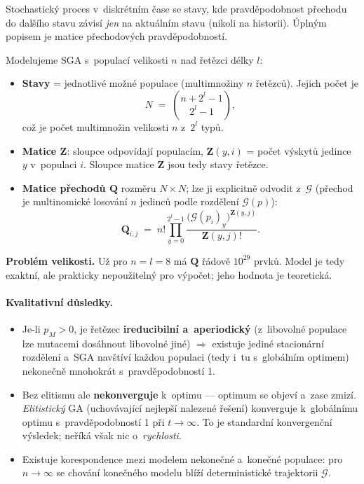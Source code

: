 \documentclass[11pt,a4paper]{article}
\theoremstyle{definition}
\begin{document}
\begin{defbox}
Stochastický proces v~diskrétním čase se stavy, kde pravděpodobnost přechodu
do dalšího stavu závisí \emph{jen} na aktuálním stavu (nikoli na historii).
Úplným popisem je matice přechodových pravděpodobností.
\end{defbox}

Modelujeme SGA s~populací velikosti $n$ nad řetězci délky $l$:
\begin{itemize}
\item \textbf{Stavy} = jednotlivé možné populace (multimnožiny $n$ řetězců).
  Jejich počet je
  \[
  N \;=\; \binom{n + 2^l - 1}{\,2^l - 1\,},
  \]
  což je počet multimnožin velikosti $n$ z~$2^l$ typů.
\item \textbf{Matice $\mathbf{Z}$}: sloupce odpovídají populacím,
  $\mathbf{Z}(y,i)$ = počet výskytů jedince $y$ v~populaci $i$. Sloupce
  matice $\mathbf{Z}$ jsou tedy stavy řetězce.
\item \textbf{Matice přechodů $\mathbf{Q}$} rozměru $N \times N$; lze ji
  explicitně odvodit z~$\mathcal{G}$ (přechod je multinomické losování
  $n$ jedinců podle rozdělení $\mathcal{G}(p)$):
  \[
  \mathbf{Q}_{i,j} \;=\; n! \prod_{y=0}^{2^l-1}
  \frac{\big(\mathcal{G}(p_i)_y\big)^{\mathbf{Z}(y,j)}}{\mathbf{Z}(y,j)!}.
  \]
\end{itemize}

\textbf{Problém velikosti.} Už pro $n = l = 8$ má $\mathbf{Q}$ řádově
$10^{29}$ prvků. Model je tedy exaktní, ale prakticky nepoužitelný pro
výpočet; jeho hodnota je teoretická.

\paragraph{Kvalitativní důsledky.}
\begin{itemize}
\item Je-li $p_M > 0$, je řetězec \textbf{ireducibilní a~aperiodický}
  (z~libovolné populace lze mutacemi dosáhnout libovolné jiné) $\Rightarrow$
  existuje jediné stacionární rozdělení a~SGA navštíví každou populaci
  (tedy i~tu s~globálním optimem) nekonečně mnohokrát s~pravděpodobností 1.
\item Bez elitismu ale \textbf{nekonverguje} k~optimu --- optimum se objeví
  a~zase zmizí. \emph{Elitistický} GA (uchovávající nejlepší nalezené řešení)
  konverguje k~globálnímu optimu s~pravděpodobností 1 při $t \to \infty$.
  To je standardní konvergenční výsledek; neříká však nic o~\emph{rychlosti}.
\item Existuje korespondence mezi modelem nekonečné a~konečné populace:
  pro $n \to \infty$ se chování konečného modelu blíží deterministické
  trajektorii $\mathcal{G}$.
\end{itemize}
\end{document}
